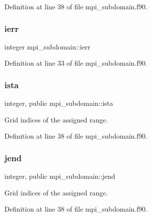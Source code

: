 Definition at line 38 of file mpi\+\_\+subdomain.\+f90.

\mbox{\label{namespacempi__subdomain_acd16f258caed20a7d8d38cd28ae64688}} 
\subsubsection{\texorpdfstring{ierr}{ierr}}
{\footnotesize\ttfamily integer mpi\+\_\+subdomain\+::ierr}



Definition at line 33 of file mpi\+\_\+subdomain.\+f90.

\mbox{\label{namespacempi__subdomain_ab8925faaa6f45326c1d11efa37e03566}} 
\subsubsection{\texorpdfstring{ista}{ista}}
{\footnotesize\ttfamily integer, public mpi\+\_\+subdomain\+::ista}



Grid indices of the assigned range. 



Definition at line 38 of file mpi\+\_\+subdomain.\+f90.

\mbox{\label{namespacempi__subdomain_a06433a0d1a081c51202a0010c21c9d36}} 
\subsubsection{\texorpdfstring{jend}{jend}}
{\footnotesize\ttfamily integer, public mpi\+\_\+subdomain\+::jend}



Grid indices of the assigned range. 



Definition at line 38 of file mpi\+\_\+subdomain.\+f90.

\mbox{\label{namespacempi__subdomain_ac22380b1c941dd6c53cabe7287d185e9}} 
